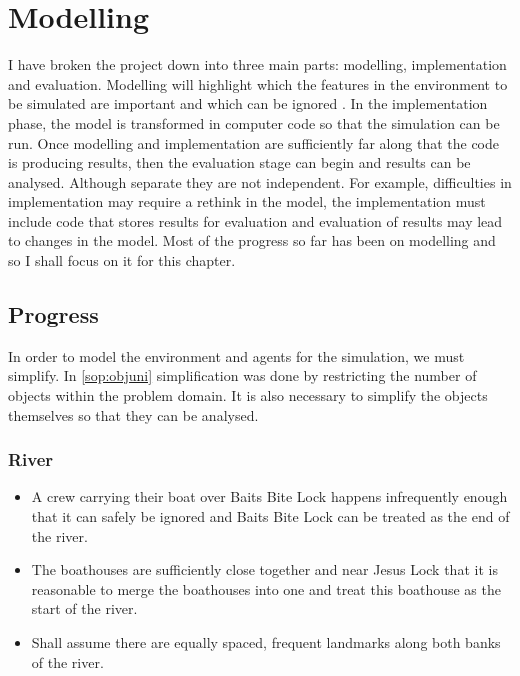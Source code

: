 \chapter{Modelling} 

I have broken
the project down into three main parts: modelling,
implementation and evaluation. Modelling will highlight which the features in the
environment to be simulated are important and which can be ignored
\cite{Sterling2009}. In the implementation phase, the model is transformed in
computer code so that the simulation can be run. Once modelling and
implementation are sufficiently far along that the code is producing
results, then the evaluation stage can begin and results can be
analysed. Although separate they are not independent. For example, difficulties in implementation may require a rethink in the
model, the implementation must include code that stores results for
evaluation and evaluation of results may lead to changes in the model. Most of the progress so far has been on modelling and so I shall focus
on it for this chapter.


\section{Progress} \label{prog:model}
In order to model the environment and agents for the simulation, we
must simplify. In \ref{sop:objuni} simplification was done by
restricting the number of 
objects within the problem domain. It is also necessary to
simplify the objects themselves so that they can be analysed.

\subsection{River}
\begin{itemize}
  \item A crew carrying their boat over Baits Bite Lock happens
    infrequently enough that it can safely be ignored and Baits Bite
    Lock can be treated as the end of the river.
  \item The boathouses are sufficiently close together and near Jesus
    Lock that it is reasonable to merge the boathouses into one and
    treat this boathouse as the start of the river. 
  \item Shall assume there are equally spaced, frequent landmarks
    along both banks of the river.
\end{itemize}

